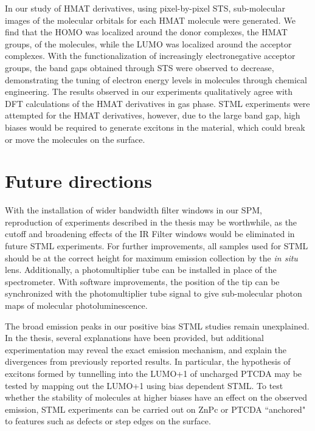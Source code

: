 In our study of HMAT derivatives, using pixel-by-pixel \ac{STS}, sub-molecular images of the molecular orbitals for each HMAT molecule were generated. We find that the HOMO was localized around the donor complexes, the HMAT groups, of the molecules, while the LUMO was localized around the acceptor complexes. With the functionalization of increasingly electronegative acceptor groups, the band gaps obtained through \ac{STS} were observed to decrease, demonstrating the tuning of electron energy levels in molecules through chemical engineering. The results observed in our experiments qualitatively agree with DFT calculations of the HMAT derivatives in gas phase. \ac{STML} experiments were attempted for the HMAT derivatives, however, due to the large band gap, high biases would be required to generate excitons in the material, which could break or move the molecules on the surface.




\section{Future directions}

With the installation of wider bandwidth filter windows in our \ac{SPM}, reproduction of experiments described in the thesis may be worthwhile, as the cutoff and broadening effects of the IR Filter windows would be eliminated in future \ac{STML} experiments. For further improvements, all samples used for \ac{STML} should be at the correct height for maximum emission collection by the \textit{in situ} lens. Additionally, a photomultiplier tube can be installed in place of the spectrometer. With software improvements, the position of the tip can be synchronized with the photomultiplier tube signal to give sub-molecular photon maps of molecular photoluminescence.

The broad emission peaks in our positive bias \ac{STML} studies remain unexplained. In the thesis, several explanations have been provided, but additional experimentation may reveal the exact emission mechanism, and explain the divergences from previously reported results. In particular, the hypothesis of excitons formed by tunnelling into the LUMO+1 of uncharged \ac{PTCDA} may be tested by mapping out the LUMO+1 using bias dependent \ac{STML}. To test whether the stability of molecules at higher biases have an effect on the observed emission, \ac{STML} experiments can be carried out on \ac{ZnPc} or \ac{PTCDA} ``anchored" to features such as defects or step edges on the surface. 

